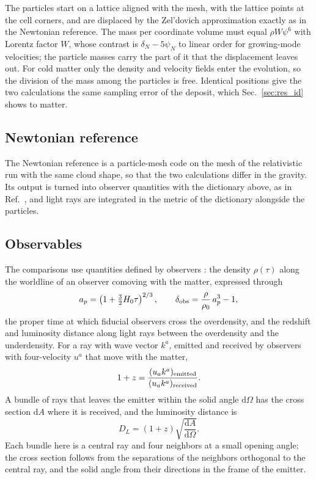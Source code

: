\documentclass[aps,prd,twocolumn,10pt,superscriptaddress,nofootinbib,longbibliography,floatfix]{revtex4-2}
\newcommand{\dd}{\mathrm{d}}
\newcommand{\psiN}{\psi_N}
\newcommand{\dN}{\delta_N}
\begin{document}
The particles start on a lattice aligned with the mesh, with the lattice points at the cell corners, and are displaced by the Zel'dovich approximation exactly as in the Newtonian reference. The mass per coordinate volume must equal $\rho W\psi^6$ with Lorentz factor $W$, whose contrast is $\dN - 5\psiN$ to linear order for growing-mode velocities; the particle masses carry the part of it that the displacement leaves out. For cold matter only the density and velocity fields enter the evolution, so the division of the mass among the particles is free. Identical positions give the two calculations the same sampling error of the deposit, which Sec.~\ref{sec:res_id} shows to matter.

\subsection{Newtonian reference}

The Newtonian reference is a particle-mesh code on the mesh of the relativistic run with the same cloud shape, so that the two calculations differ in the gravity. Its output is turned into observer quantities with the dictionary above, as in Ref.~\cite{East:2017qmk}, and light rays are integrated in the metric of the dictionary alongside the particles.

\subsection{Observables}

The comparisons use quantities defined by observers \cite{East:2017qmk,East:2019chx}: the density $\rho(\tau)$ along the worldline of an observer comoving with the matter, expressed through
\begin{equation}
a_p = \left(1 + \tfrac{3}{2}H_0\tau\right)^{2/3}, \qquad \delta_{\rm obs} = \frac{\rho}{\rho_0}\,a_p^{3} - 1 ,
\end{equation}
the proper time at which fiducial observers cross the overdensity, and the redshift and luminosity distance along light rays between the overdensity and the underdensity. For a ray with wave vector $k^a$, emitted and received by observers with four-velocity $u^a$ that move with the matter,
\begin{equation}
1 + z = \frac{(u_a k^a)_{\rm emitted}}{(u_a k^a)_{\rm received}} .
\end{equation}
A bundle of rays that leaves the emitter within the solid angle $\dd\Omega$ has the cross section $\dd A$ where it is received, and the luminosity distance is
\begin{equation}
D_L = (1+z)\sqrt{\frac{\dd A}{\dd\Omega}} .
\end{equation}
Each bundle here is a central ray and four neighbors at a small opening angle; the cross section follows from the separations of the neighbors orthogonal to the central ray, and the solid angle from their directions in the frame of the emitter.
\end{document}
